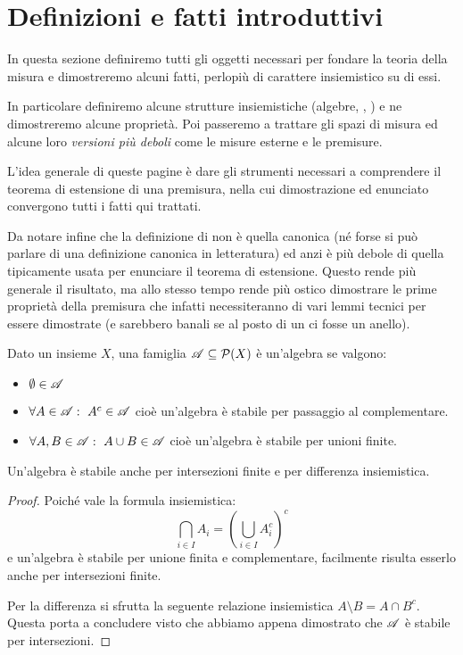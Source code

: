 \section{Definizioni e fatti introduttivi}
In questa sezione definiremo tutti gli oggetti necessari per fondare la teoria della misura e dimostreremo alcuni fatti, perlopiù di carattere insiemistico su di essi.

In particolare definiremo alcune strutture insiemistiche (algebre, \sigalg[e], \semiring[i]) e ne dimostreremo alcune proprietà. Poi passeremo a trattare gli spazi di misura ed alcune loro \emph{versioni più deboli} come le misure esterne e le premisure.

L'idea generale di queste pagine è dare gli strumenti necessari a comprendere il teorema di estensione di una premisura, nella cui dimostrazione ed enunciato convergono tutti i fatti qui trattati. 

Da notare infine che la definizione di \semiring{} non è quella canonica (né forse si può parlare di una definizione canonica in letteratura) ed anzi è più debole di quella tipicamente usata per enunciare il teorema di estensione. Questo rende più generale il risultato, ma allo stesso tempo rende più ostico dimostrare le prime proprietà della premisura che infatti necessiteranno di vari lemmi tecnici per essere dimostrate (e sarebbero banali se al posto di un \semiring{} ci fosse un anello).

\begin{definition}[Algebra]
	Dato un insieme $X$, una famiglia $\mathscr A\subseteq\mathcal P(X)$ è un'algebra se valgono:
	\begin{itemize}
		\item $\emptyset\in\mathscr A$
		\item $\forall A\in\mathscr A:\ A^c\in\mathscr A$ cioè un'algebra è stabile per passaggio al complementare.
		\item $\forall A,B\in\mathscr A:\ A\cup B\in\mathscr A$ cioè un'algebra è stabile per unioni finite.
	\end{itemize}
\end{definition}
\begin{remark}\label{ProprietaAlg}
	Un'algebra è stabile anche per intersezioni finite e per differenza insiemistica.
\end{remark}
\begin{proof}
	Poiché vale la formula insiemistica:
	\begin{equation*}
		\bigcap_{i\in I} A_i = \left( \bigcup_{i\in I} A_i^c \right)^c
	\end{equation*}
	e un'algebra è stabile per unione finita e complementare, facilmente risulta esserlo anche per intersezioni finite.
	
	Per la differenza si sfrutta la seguente relazione insiemistica $A\setminus B=A\cap B^c$. Questa porta a concludere visto che abbiamo appena dimostrato che $\mathscr A$ è stabile per intersezioni.
\end{proof}


